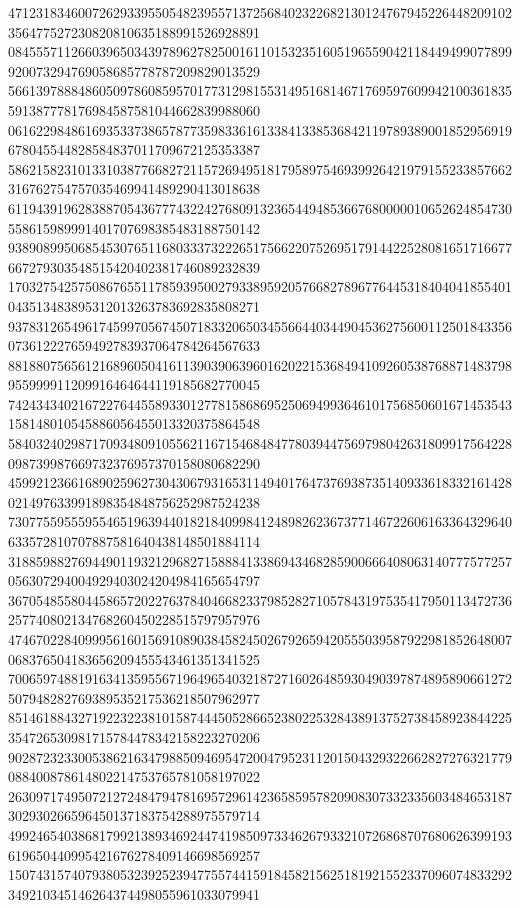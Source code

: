 \begin{DoxyCode}
      471231834600726293395505482395571372568402322682130124767945226448209102356477527230820810635188991526928891
      084555711266039650343978962782500161101532351605196559042118449499077899920073294769058685778787209829013529
      566139788848605097860859570177312981553149516814671769597609942100361835591387778176984587581044662839988060
      061622984861693533738657877359833616133841338536842119789389001852956919678045544828584837011709672125353387
      586215823101331038776682721157269495181795897546939926421979155233857662316762754757035469941489290413018638
      611943919628388705436777432242768091323654494853667680000010652624854730558615989991401707698385483188750142
      938908995068545307651168033373222651756622075269517914422528081651716677667279303548515420402381746089232839
      170327542575086765511785939500279338959205766827896776445318404041855401043513483895312013263783692835808271
      937831265496174599705674507183320650345566440344904536275600112501843356073612227659492783937064784264567633
      881880756561216896050416113903906396016202215368494109260538768871483798955999911209916464644119185682770045
      742434340216722764455893301277815868695250694993646101756850601671453543158148010545886056455013320375864548
      584032402987170934809105562116715468484778039447569798042631809917564228098739987669732376957370158080682290
      459921236616890259627304306793165311494017647376938735140933618332161428021497633991898354848756252987524238
      730775595559554651963944018218409984124898262367377146722606163364329640633572810707887581640438148501884114
      318859882769449011932129682715888413386943468285900666408063140777577257056307294004929403024204984165654797
      367054855804458657202276378404668233798528271057843197535417950113472736257740802134768260450228515797957976
      474670228409995616015691089038458245026792659420555039587922981852648007068376504183656209455543461351341525
      700659748819163413595567196496540321872716026485930490397874895890661272507948282769389535217536218507962977
      851461884327192232238101587444505286652380225328438913752738458923844225354726530981715784478342158223270206
      902872323300538621634798850946954720047952311201504329322662827276321779088400878614802214753765781058197022
      263097174950721272484794781695729614236585957820908307332335603484653187302930266596450137183754288975579714
      499246540386817992138934692447419850973346267933210726868707680626399193619650440995421676278409146698569257
      150743157407938053239252394775574415918458215625181921552337096074833292349210345146264374498055961033079941

\end{DoxyCode}

